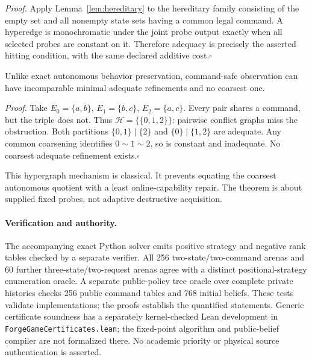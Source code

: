 \emph{Proof.}
Apply Lemma~\ref{lem:hereditary} to the hereditary family consisting of the
empty set and all nonempty state sets having a common legal command.
A hyperedge is monochromatic under the
joint probe output exactly when all selected probes are constant on it.
Therefore adequacy is precisely the asserted hitting condition, with the
same declared additive cost.\hfill$\square$

\begin{proposition}
\label{online-no-coarsest}
Unlike exact autonomous behavior preservation, command-safe observation can
have incomparable minimal adequate refinements and no coarsest one.
\end{proposition}

\emph{Proof.}
Take $E_0=\{a,b\}$, $E_1=\{b,c\}$, $E_2=\{a,c\}$. Every pair shares a
command, but the triple does not. Thus $\mathcal H=\{\{0,1,2\}\}$: pairwise
conflict graphs miss the obstruction. Both partitions
$\{0,1\}\mid\{2\}$ and $\{0\}\mid\{1,2\}$ are adequate. Any common
coarsening identifies $0\sim1\sim2$, so is constant and inadequate. No
coarsest adequate refinement exists.\hfill$\square$

This hypergraph mechanism is classical. It prevents equating the coarsest
autonomous quotient with a least online-capability repair. The theorem is
about supplied fixed probes, not adaptive destructive acquisition.

\paragraph{Verification and authority.}
The accompanying exact Python solver emits positive strategy and negative
rank tables checked by a separate verifier. All 256 two-state/two-command
arenas and 60 further three-state/two-request arenas agree with a distinct
positional-strategy enumeration oracle. A separate public-policy tree oracle
over complete private histories checks 256 public command tables and 768
initial beliefs. These tests validate implementations; the proofs establish
the quantified statements. Generic certificate soundness has a separately
kernel-checked Lean development in \texttt{ForgeGameCertificates.lean}; the
fixed-point algorithm and public-belief compiler are not formalized there.
No academic priority or physical source authentication is asserted.
